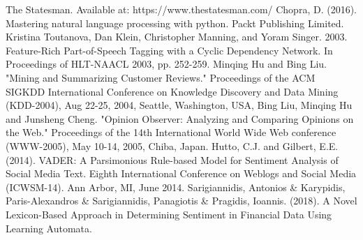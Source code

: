 \documentclass[a4paper, 10pt, conference]{ieeeconf}
\begin{document}
\begin{thebibliography}{100}
	The Statesman. Available at: https://www.thestatesman.com/
	 Chopra, D. (2016). Mastering natural language processing with python. Packt Publishing Limited.
	 Kristina Toutanova, Dan Klein, Christopher Manning, and Yoram Singer. 2003. Feature-Rich Part-of-Speech Tagging with a Cyclic Dependency Network. In Proceedings of HLT-NAACL 2003, pp. 252-259.
	Minqing Hu and Bing Liu. "Mining and Summarizing Customer Reviews." 
	Proceedings of the ACM SIGKDD International Conference on Knowledge Discovery and Data Mining (KDD-2004), Aug 22-25, 2004, Seattle,     Washington, USA, 
	Bing Liu, Minqing Hu and Junsheng Cheng. "Opinion Observer: Analyzing 
	and Comparing Opinions on the Web." Proceedings of the 14th 
	International World Wide Web conference (WWW-2005), May 10-14,  2005, Chiba, Japan.
	Hutto, C.J. and Gilbert, E.E. (2014). VADER: A Parsimonious Rule-based Model for Sentiment Analysis of Social Media Text. Eighth International Conference on
	Weblogs and Social Media (ICWSM-14). Ann Arbor, MI, June 2014.
	Sarigiannidis, Antonios \& Karypidis, Paris-Alexandros \& Sarigiannidis, Panagiotis \& Pragidis, Ioannis. (2018). A Novel Lexicon-Based Approach in Determining Sentiment in Financial Data Using Learning Automata.
	
\end{thebibliography}
\end{document}
